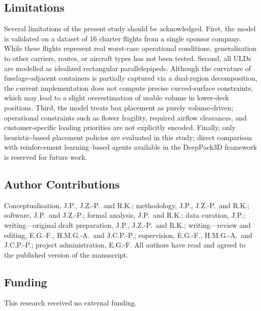 
\subsection{Limitations}
\label{sec:limitations}

Several limitations of the present study should be acknowledged.
First, the model is validated on a dataset of 16 charter flights from
a single sponsor company.
While these flights represent real worst-case operational conditions,
generalisation to other carriers, routes, or aircraft types has not been
tested.
Second, all ULDs are modelled as idealized rectangular parallelepipeds.
Although the curvature of fuselage-adjacent containers is partially
captured via a dual-region decomposition, the current implementation
does not compute precise curved-surface constraints, which may lead to
a slight overestimation of usable volume in lower-deck positions.
Third, the model treats box placement as purely volume-driven;
operational constraints such as flower fragility, required airflow
clearances, and customer-specific loading priorities are not explicitly
encoded.
Finally, only heuristic-based placement policies are evaluated in this
study; direct comparison with reinforcement learning--based agents
available in the DeepPack3D framework is reserved for future work.



\subsection*{Author Contributions}
Conceptualisation, J.P., J.Z.-P.\ and R.K.;
methodology, J.P., J.Z.-P.\ and R.K.;
software, J.P.\ and J.Z.-P.;
formal analysis, J.P.\ and R.K.;
data curation, J.P.;
writing---original draft preparation, J.P., J.Z.-P.\ and R.K.;
writing---review and editing, E.G.-F., H.M.G.-A.\ and J.C.P.-P.;
supervision, E.G.-F., H.M.G.-A.\ and J.C.P.-P.;
project administration, E.G.-F.
All authors have read and agreed to the published version of the
manuscript.

\subsection*{Funding}
This research received no external funding.

